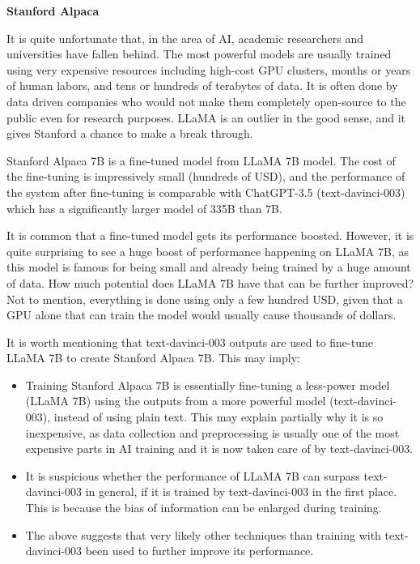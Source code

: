 \vspace{0.1in}
\noindent \textbf{Stanford Alpaca}
\vspace{0.1in}

It is quite unfortunate that, in the area of AI, academic researchers and universities have fallen behind. The most powerful models are usually trained using very expensive resources including high-cost GPU clusters, months or years of human labors, and tens or hundreds of terabytes of data. It is often done by data driven companies who would not make them completely open-source to the public even for research purposes. LLaMA is an outlier in the good sense, and it gives Stanford a chance to make a break through.

Stanford Alpaca 7B is a fine-tuned model from LLaMA 7B model. The cost of the fine-tuning is impressively small (hundreds of USD), and the performance of the system after fine-tuning is comparable with ChatGPT-3.5 (text-davinci-003) which has a significantly larger model of 335B than 7B.

It is common that a fine-tuned model gets its performance boosted. However, it is quite surprising to see a huge boost of performance happening on LLaMA 7B, as this model is famous for being small and already being trained by a huge amount of data. How much potential does LLaMA 7B have that can be further improved? Not to mention, everything is done using only a few hundred USD, given that a GPU alone that can train the model would usually cause thousands of dollars.

It is worth mentioning that text-davinci-003 outputs are used to fine-tune LLaMA 7B to create Stanford Alpaca 7B. This may imply:
\begin{itemize}
	\item Training Stanford Alpaca 7B is essentially fine-tuning a less-power model (LLaMA 7B) using the outputs from a more powerful model (text-davinci-003), instead of using plain text. This may explain partially why it is so inexpensive, as data collection and preprocessing is usually one of the most expensive parts in AI training and it is now taken care of by text-davinci-003.
	\item It is suspicious whether the performance of LLaMA 7B can surpass text-davinci-003 in general, if it is trained by text-davinci-003 in the first place. This is because the bias of information can be enlarged during training.
	\item The above suggests that very likely other techniques than training with text-davinci-003 been used to further improve its performance.
\end{itemize}

